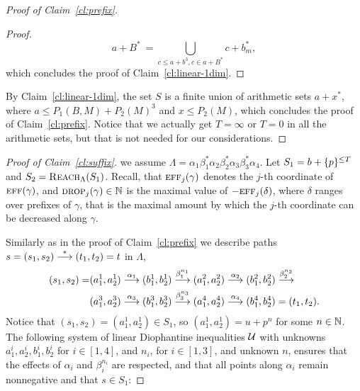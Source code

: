 \begin{appendixproof}
\begin{proof}[Proof of Claim~\ref{cl:prefix}]
\begin{proof}
\[
a+B^* \ = \bigcup_{c \leq a+b^3, c \in a+B^*} c + b_m^*,
\]
which concludes the proof of Claim~\ref{cl:linear-1dim}.
\end{proof}
%
By Claim~\ref{cl:linear-1dim}, the set $S$ is a finite union of arithmetic sets  $a+x^*$, where 
$a \leq P_1(B,M) + P_2(M)^3$ and $x \leq P_2(M)$,
which concludes the proof of Claim~\ref{cl:prefix}.
Notice that we actually get $T = \infty$ or $T=0$ in all the arithmetic sets, but that is not needed for our considerations.
\end{proof}




\begin{proof}[Proof of Claim~\ref{cl:suffix}]
\Wlog we assume $\Lambda = \alpha_1\beta_1^*\alpha_2\beta_2^*\alpha_3\beta_3^*\alpha_4$.
Let $S_1 = b + \{p\}^{\leq T}$  and $S_2 = \textsc{Reach}_{\Lambda}(S_1)$. Recall, that $\textsc{eff}_j(\gamma)$ denotes the $j$-th coordinate of $\textsc{eff}(\gamma)$, and
$\textsc{drop}_j(\gamma)\in\mathbb{N}$ is the maximal value of $-\textsc{eff}_j(\delta)$, where $\delta$ ranges over prefixes of $\gamma$,
that is  the maximal amount by which the $j$-th coordinate can be decreased along $\gamma$.

Similarly as in the proof of Claim~\ref{cl:prefix} we describe paths $s = (s_1,s_2) \stackrel{*}{\longrightarrow} (t_1, t_2) = t$ in $\Lambda$,
\begin{align*}
(s_1, s_2) = &
(a_1^1, a_2^1) \stackrel{\alpha_1}{\longrightarrow} (b_1^1, b_2^1) \stackrel{\beta_1^{n_1}}{\longrightarrow}
(a_1^2, a_2^2) \stackrel{\alpha_2}{\longrightarrow} (b_1^2, b_2^2) \stackrel{\beta_2^{n_2}}{\longrightarrow} \\
& (a_1^3, a_2^3) \stackrel{\alpha_3}{\longrightarrow} (b_1^3, b_2^3) \stackrel{\beta_3^{n_3}}{\longrightarrow}
(a_1^4, a_2^4) \stackrel{\alpha_4}{\longrightarrow} (b_1^4, b_2^4) = (t_1, t_2).
\end{align*}
Notice that $(s_1, s_2) = (a_1^1, a_2^1) \in S_1$, so $(a_1^1, a_2^1) = u + p^n$ for some $n \in \mathbb{N}$. The following system of linear Diophantine inequalities $\mathcal{U}$ with unknowns $a_1^i, a_2^i, b_1^i, b_2^i$ for $i \in [1,4]$, and $n_i$, for $i \in [1,3]$, and unknown $n$, ensures that the effects of $\alpha_i$ and $\beta_i^{n_i}$ are respected, and that all points along $\alpha_i$ remain nonnegative and that $s \in S_1$:


\end{proof}
\end{appendixproof}
